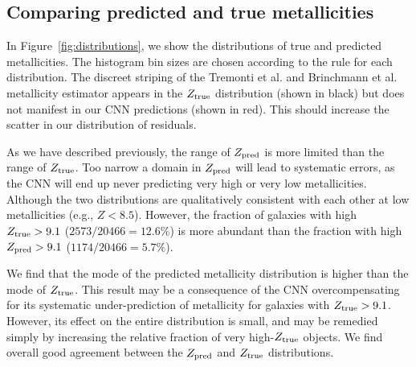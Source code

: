 \documentclass[fleqn,usenatbib]{mnras}
\begin{document}
\subsection{Comparing predicted and true metallicities}

In Figure~\ref{fig:distributions}, we show the distributions of true and predicted metallicities.
The histogram bin sizes are chosen according to the \cite{Freedman1981} rule for each distribution.
The discreet striping of the Tremonti et al. and Brinchmann et al. metallicity estimator appears in the $Z_{\rm true}$ distribution (shown in black) but does not manifest in our CNN predictions (shown in red).
This should increase the scatter in our distribution of residuals.

As we have described previously, the range of $Z_{\rm pred}$ is more limited than the range of $Z_{\rm true}$.
Too narrow a domain in $Z_{\rm pred}$ will lead to systematic errors, as the CNN will end up never predicting very high or very low metallicities.
Although the two distributions are qualitatively consistent with each other at low metallicities (e.g., $Z < 8.5$).
However, the fraction of galaxies with high $Z_{\rm true} > 9.1$ ($2573/20466 = 12.6\%$) is more abundant than the fraction with high $Z_{\rm pred} > 9.1$ ($1174/20466 = 5.7\%$).

We find that the mode of the predicted metallicity distribution is higher than the mode of $Z_{\rm true}$.
This result may be a consequence of the CNN overcompensating for its systematic under-prediction of metallicity for galaxies with $Z_{\rm true} > 9.1$.
However, its effect on the entire distribution is small, and may be remedied simply by increasing the relative fraction of very high-$Z_{\rm true}$ objects.
We find overall good agreement between the $Z_{\rm pred}$ and $Z_{\rm true}$ distributions.
\end{document}
